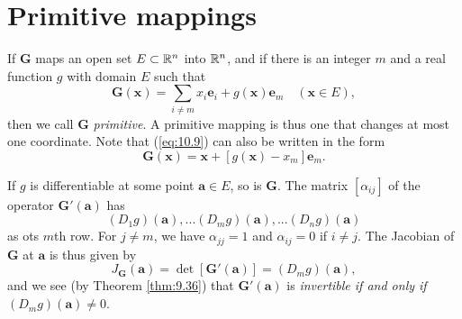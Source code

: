 
\section{Primitive mappings}


\begin{mydef}
    \label{mydef:10.5}
    If $\mathbf{G}$ maps an open set $E \subset {\protect\mathbb R}^n$ into ${\protect\mathbb R}^n$, 
    and if there is an integer $m$ and a real function $g$ with domain $E$ such that
    \begin{equation}
        \label{eq:10.9}
        \mathbf{G(x)} = \sum_{i \neq m} x_i \mathbf{e}_i + g(\mathbf{x}) \mathbf{e}_m
        \quad 
        (\mathbf{x} \in E) ,
    \end{equation}
    then we call $\mathbf{G}$ \emph{primitive}.
    A primitive mapping is thus one that changes at most one coordinate.
    Note that (\ref{eq:10.9}) can also be written in the form 
    \begin{equation}
        \label{eq:10.10}
        \mathbf{G(x)} = \mathbf{x} + \left[ g(\mathbf{x}) - x_m \right] \mathbf{e}_m .
    \end{equation}
    
    If $g$ is differentiable at some point $\mathbf{a} \in E$, so is $\mathbf{G}$.
    The matrix $[\alpha_{ij}]$ of the operator $\mathbf{G'(a)}$ has 
    \begin{equation}
        \label{eq:10.11}
        (D_1 g)(\mathbf{a}),...
        (D_m g)(\mathbf{a}),...
        (D_n g)(\mathbf{a})
    \end{equation}
    as ots $m$th row.
    For $j \neq m$, we have $\alpha_{jj} = 1$ and $\alpha_{ij} = 0$ if $i \neq j$.
    The Jacobian of $\mathbf{G}$ at $\mathbf{a}$ is thus given by 
    \begin{equation}
        \label{eq:10.12}
        J_{\mathbf{G}}(\mathbf{a}) = 
        \det [\mathbf{G'(a)}] = 
        (D_m g)(\mathbf{a}),
    \end{equation}
    and we see (by Theorem \ref{thm:9.36}) that $\mathbf{G'(a)}$ is 
    \emph{invertible if and only if} $(D_m g)(\mathbf{a}) \neq 0$.
\end{mydef}


